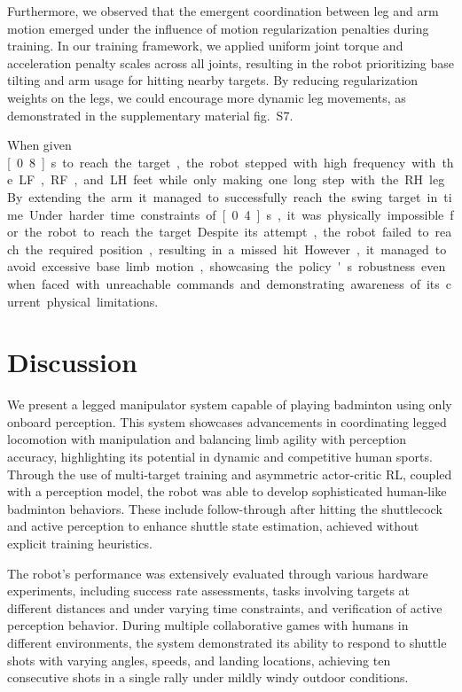 \documentclass[9pt,twocolumn,twoside]{osajnl}
\begin{document}
Furthermore, we observed that the emergent coordination between leg and arm motion emerged under the influence of motion regularization penalties during training. In our training framework, we applied uniform joint torque and acceleration penalty scales across all joints, resulting in the robot prioritizing base tilting and arm usage for hitting nearby targets. By reducing regularization weights on the legs, we could encourage more dynamic leg movements, as demonstrated in the supplementary material fig.~S7.

When given \unit[0.8]{s} to reach the target, the robot stepped with high frequency with the LF, RF, and LH feet while only making one long step with the RH leg. By extending the arm it managed to successfully reach the swing target in time. Under harder time constraints of \unit[0.4]{s}, it was physically impossible for the robot to reach the target. Despite its attempt, the robot failed to reach the required position, resulting in a missed hit. However, it managed to avoid excessive base limb motion, showcasing the policy's robustness even when faced with unreachable commands and demonstrating awareness of its current physical limitations.



\section*{Discussion}
We present a legged manipulator system capable of playing badminton using only onboard perception. This system showcases advancements in coordinating legged locomotion with manipulation and balancing limb agility with perception accuracy, highlighting its potential in dynamic and competitive human sports. Through the use of multi-target training and asymmetric actor-critic \ac{RL}, coupled with a perception model, the robot was able to develop sophisticated human-like badminton behaviors. These include follow-through after hitting the shuttlecock and active perception to enhance shuttle state estimation, achieved without explicit training heuristics.

The robot's performance was extensively evaluated through various hardware experiments, including success rate assessments, tasks involving targets at different distances and under varying time constraints, and verification of active perception behavior. During multiple collaborative games with humans in different environments, the system demonstrated its ability to respond to shuttle shots with varying angles, speeds, and landing locations, achieving ten consecutive shots in a single rally under mildly windy outdoor conditions.
\end{document}
